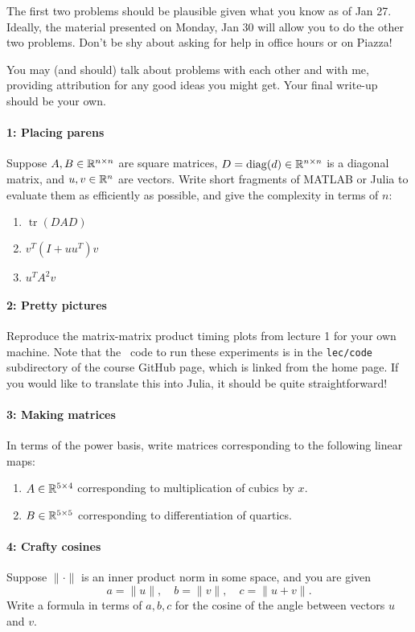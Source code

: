 \documentclass[12pt, leqno]{article} %
\begin{document}

The first two problems should be plausible given what you know as of
Jan 27.  Ideally, the material presented on Monday, Jan 30 will allow
you to do the other two problems.  Don't be shy about asking for help
in office hours or on Piazza!

You may (and should) talk about problems with each other and with me,
providing attribution for any good ideas you might get.  Your final
write-up should be your own.

\paragraph*{1: Placing parens}
Suppose $A, B \in \mathbb{R}^{n \times n}$ are square matrices,
$D = \operatorname{diag}(d) \in \mathbb{R}^{n \times n}$ is a diagonal matrix,
and $u, v \in \mathbb{R}^n$ are vectors.  Write short
fragments of MATLAB or Julia to evaluate them as efficiently
as possible, and give the complexity in terms of $n$:
\begin{enumerate}
\item $\operatorname{tr}(DAD)$
\item $v^T (I+uu^T) v$
\item $u^T A^2 v$
\end{enumerate}

\paragraph*{2: Pretty pictures}
Reproduce the matrix-matrix product timing plots from lecture 1 for your
own machine. Note that the \matlab\ code to run these experiments is in
the {\tt lec/code} subdirectory of the course GitHub page, which is
linked from the home page.  If you would like to translate this into
Julia, it should be quite straightforward!

\paragraph*{3: Making matrices}
In terms of the power basis, write matrices corresponding to the
following linear maps:
\begin{enumerate}
\item $A \in \mathbb{R}^{5 \times 4}$ corresponding to multiplication of cubics
by $x$.
\item $B \in \mathbb{R}^{5 \times 5}$ corresponding to differentiation of quartics.
\end{enumerate}

\paragraph*{4: Crafty cosines}
Suppose $\|\cdot\|$ is an inner product norm in some space, and you
are given
\[
  a = \|u\|, \quad
  b = \|v\|, \quad
  c = \|u+v\|.
\]
Write a formula in terms of $a, b, c$ for the cosine of the angle
between vectors $u$ and $v$.
\end{document}
